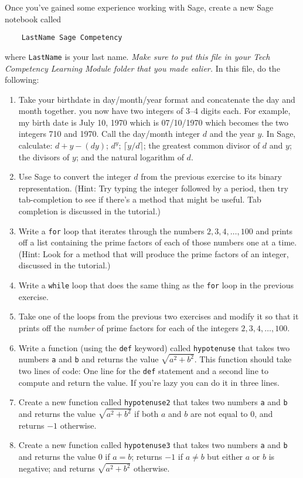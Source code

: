 \documentclass[11pt,letterpaper]{article}
\begin{document}
\begin{enumerate}
Once you've gained some experience working with Sage, create a new Sage notebook called 
\begin{verbatim}
	LastName Sage Competency
\end{verbatim}
where \verb.LastName. is your last name. \emph{Make sure to put this file in your Tech Competency Learning Module folder that you made ealier.} In this file, do the following: 
	\begin{enumerate}
		\item Take your birthdate in day/month/year format and concatenate the day and month together. you now have two integers of 3--4 digits each. For example, my birth date is July 10, 1970 which is 07/10/1970 which becomes the two integers 710 and 1970. Call the day/month integer $d$ and the year $y$. In Sage, calculate: $d+y - (dy)$; $d^y$; $\lceil y/d \rceil$; the greatest common divisor of $d$ and $y$; the divisors of $y$; and the natural logarithm of $d$.  
		\item Use Sage to convert the integer $d$ from the previous exercise to its binary representation. (Hint: Try typing the integer followed by a period, then try tab-completion to see if there's a method that might be useful. Tab completion is discussed in the tutorial.)
		\item Write a \verb.for. loop that iterates through the numbers $2,3,4,\dots,100$ and prints off a list containing the prime factors of each of those numbers one at a time. (Hint: Look for a method that will produce the prime factors of an integer, discussed in the tutorial.)
		\item Write a \verb.while. loop that does the same thing as the \verb.for. loop in the previous exercise. 
		\item Take one of the loops from the previous two exercises and modify it so that it prints off the \emph{number} of prime factors for each of the integers $2,3,4,\dots,100$. 
		\item Write a function (using the \verb.def. keyword) called \verb.hypotenuse. that takes two numbers \verb.a. and \verb.b. and returns the value $\sqrt{a^2 + b^2}$. This function should take two lines of code: One line for the \verb.def. statement and a second line to compute and return the value. If you're lazy you can do it in three lines. 
		\item Create a new function called \verb.hypotenuse2. that takes two numbers \verb.a. and \verb.b. and returns the value $\sqrt{a^2 + b^2}$ if both $a$ and $b$ are not equal to $0$, and returns $-1$ otherwise. 
		\item Create a new function called \verb.hypotenuse3. that takes two numbers \verb.a. and \verb.b. and returns the value $0$ if $a = b$; returns $-1$ if $a \neq b$ but either $a$ or $b$ is negative; and returns $\sqrt{a^2 + b^2}$ otherwise. 
	\end{enumerate}


\end{enumerate}
\end{document}
